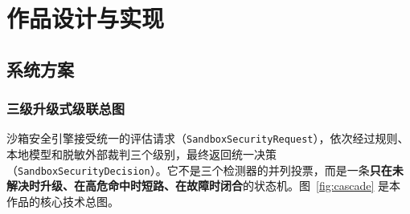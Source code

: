 \section{作品设计与实现}

\subsection{系统方案}

\subsubsection{三级升级式级联总图}

沙箱安全引擎接受统一的评估请求（\verb|SandboxSecurityRequest|），依次经过规则、本地模型和脱敏外部裁判三个级别，最终返回统一决策（\verb|SandboxSecurityDecision|）。它不是三个检测器的并列投票，而是一条\textbf{只在未解决时升级、在高危命中时短路、在故障时闭合}的状态机。图~\ref{fig:cascade} 是本作品的核心技术总图。

